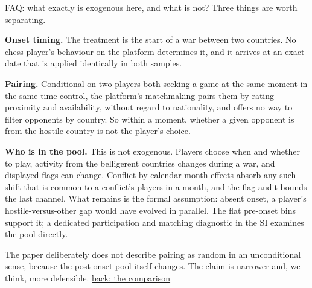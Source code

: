 \documentclass[aspectratio=169,11pt,t]{beamer}
\newcommand{\backto}[2]{\vfill\hfill\hyperlink{#1}{\textcolor{linkblue}{\scriptsize\textsf{back: #2}}}}
\begin{document}
\begin{frame}[label=faq-exogenous]{FAQ: what exactly is exogenous here, and what is not?}
  \footnotesize
  Three things are worth separating.

  \textbf{Onset timing.} The treatment is the start of a war between two countries. No chess player's behaviour on the platform determines it, and it arrives at an exact date that is applied identically in both samples.

  \textbf{Pairing.} Conditional on two players both seeking a game at the same moment in the same time control, the platform's matchmaking pairs them by rating proximity and availability, without regard to nationality, and offers no way to filter opponents by country. So within a moment, whether a given opponent is from the hostile country is not the player's choice.

  \textbf{Who is in the pool.} This is not exogenous. Players choose when and whether to play, activity from the belligerent countries changes during a war, and displayed flags can change. Conflict-by-calendar-month effects absorb any such shift that is common to a conflict's players in a month, and the flag audit bounds the last channel. What remains is the formal assumption: absent onset, a player's hostile-versus-other gap would have evolved in parallel. The flat pre-onset bins support it; a dedicated participation and matching diagnostic in the SI examines the pool directly.

  The paper deliberately does not describe pairing as random in an unconditional sense, because the post-onset pool itself changes. The claim is narrower and, we think, more defensible.
  \backto{comparison}{the comparison}
\end{frame}
\end{document}
